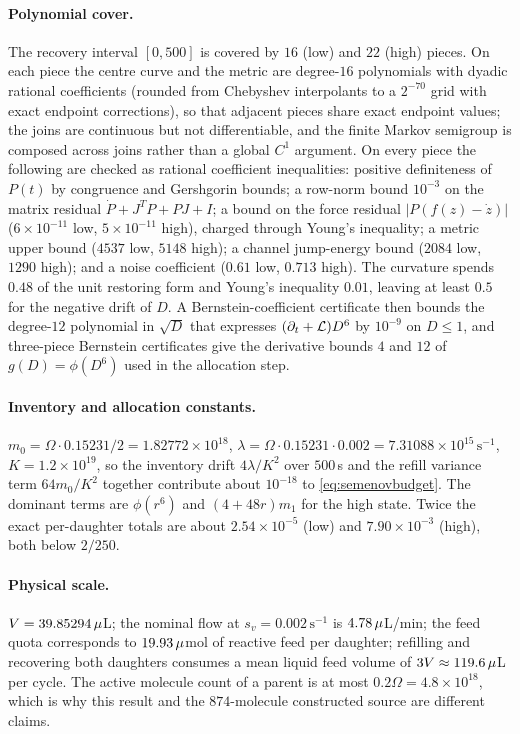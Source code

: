 \paragraph{Polynomial cover.}
The recovery interval $[0,500]$ is covered by $16$ (low) and $22$ (high) pieces. On each piece the centre curve and the metric are degree-$16$ polynomials with dyadic rational coefficients (rounded from Chebyshev interpolants to a $2^{-70}$ grid with exact endpoint corrections), so that adjacent pieces share exact endpoint values; the joins are continuous but not differentiable, and the finite Markov semigroup is composed across joins rather than a global $C^1$ argument. On every piece the following are checked as rational coefficient inequalities: positive definiteness of $P(t)$ by congruence and Gershgorin bounds; a row-norm bound $10^{-3}$ on the matrix residual $\dot P+J^TP+PJ+I$; a bound on the force residual $|P(f(z)-\dot z)|$ ($6\times10^{-11}$ low, $5\times10^{-11}$ high), charged through Young's inequality; a metric upper bound ($4537$ low, $5148$ high); a channel jump-energy bound ($2084$ low, $1290$ high); and a noise coefficient ($0.61$ low, $0.713$ high). The curvature spends $0.48$ of the unit restoring form and Young's inequality $0.01$, leaving at least $0.5$ for the negative drift of $D$. A Bernstein-coefficient certificate then bounds the degree-$12$ polynomial in $\sqrt D$ that expresses $(\partial_t+\cL)D^6$ by $10^{-9}$ on $D\le1$, and three-piece Bernstein certificates give the derivative bounds $4$ and $12$ of $g(D)=\phi(D^6)$ used in the allocation step.

\paragraph{Inventory and allocation constants.}
$m_0=\Omega\cdot0.15231/2=1.82772\times10^{18}$, $\lambda=\Omega\cdot0.15231\cdot0.002=7.31088\times10^{15}\,\mathrm s^{-1}$, $K=1.2\times10^{19}$, so the inventory drift $4\lambda/K^2$ over $500$\,s and the refill variance term $64m_0/K^2$ together contribute about $10^{-18}$ to \eqref{eq:semenovbudget}. The dominant terms are $\phi(r^6)$ and $(4+48r)m_1$ for the high state. Twice the exact per-daughter totals are about $2.54\times10^{-5}$ (low) and $7.90\times10^{-3}$ (high), both below $2/250$.

\paragraph{Physical scale.}
$V=39.85294\,\micro$L; the nominal flow at $s_v=0.002\,\mathrm s^{-1}$ is $4.78\,\micro$L/min; the feed quota corresponds to $19.93\,\micro$mol of reactive feed per daughter; refilling and recovering both daughters consumes a mean liquid feed volume of $3V\approx119.6\,\micro$L per cycle. The active molecule count of a parent is at most $0.2\Omega=4.8\times10^{18}$, which is why this result and the $874$-molecule constructed source are different claims.
